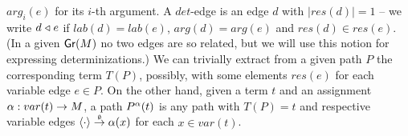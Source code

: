 \documentclass[10pt]{article}
\begin{document}
$arg_{i}(e)$ for its $i$-th argument. A $det$-edge is an edge $d$ with
$|res(d)|=1$ -- we write $d\mathrel{\triangleleft} e$ if $lab(d)=lab(e)$, $arg(d)=arg(e)$
and $res(d)\in res(e)$. (In a given ${\sf Gr}(M)$ no two edges are so
related, but we will use this notion for expressing determinizations.)
%
%
We can trivially extract from a given path $P$ the corresponding term $T(P)$, possibly,
with some elements $res(e)$ for each variable edge $e\in P$. On the other hand, 
given a term $t$ and an assignment $\alpha:var(t)\rightarrow M$, a path $P^{\alpha}(t)$ is
any path with $T(P)=t$ and respective variable edges $\langle\cdot\rangle\stackrel{\mbox{\tiny $\emptyset$}}{\rightarrow}\alpha(x)$ for
each $x\in var(t)$.
%
\end{document}

